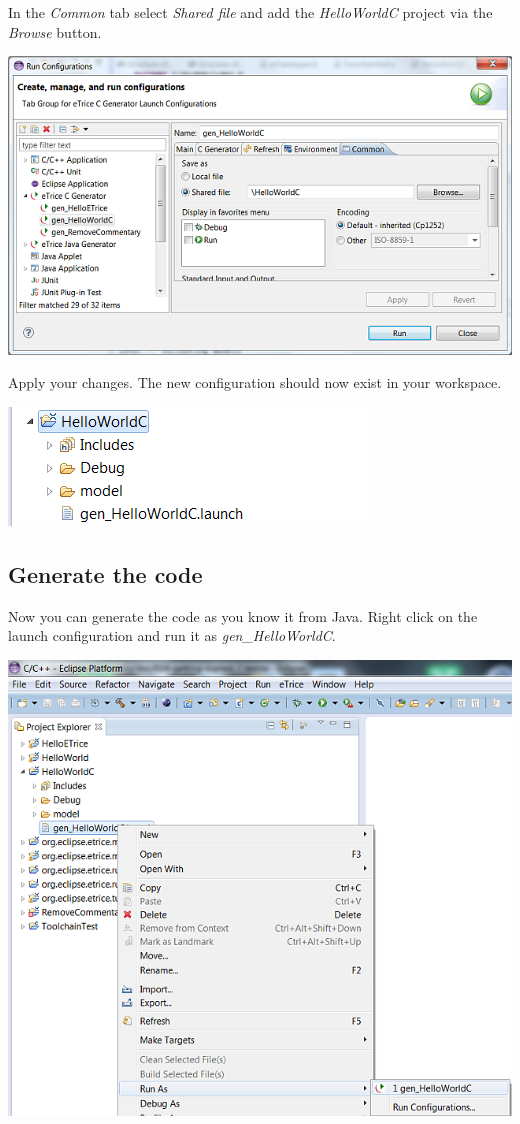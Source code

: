 In the \textit{Common} tab select \textit{Shared file} and add the \textit{HelloWorldC} project via the 
\textit{Browse} button.

\includegraphics{images/016-HelloWorldC10.png}

Apply your changes. The new configuration should now exist in your workspace.

\includegraphics{images/016-HelloWorldC11.png}


\subsection{Generate the code}

Now you can generate the code as you know it from Java. Right click on the launch configuration and run it 
as \textit{gen\_HelloWorldC}.

\includegraphics{images/016-HelloWorldC12.png}

